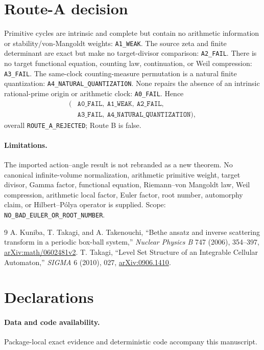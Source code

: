 \documentclass[10pt]{article}
\newif\ifroundzero
\newif\ifroundone
\begin{document}
\section{Route-A decision}
Primitive cycles are intrinsic and complete but contain no arithmetic
information or stability/von-Mangoldt weights: \texttt{A1\_WEAK}.  The
source zeta and finite determinant are exact but make no target-divisor
comparison: \texttt{A2\_FAIL}.  There is no target functional equation,
counting law, continuation, or Weil compression: \texttt{A3\_FAIL}.  The
same-clock counting-measure permutation is a natural finite quantization:
\texttt{A4\_NATURAL\_QUANTIZATION}.  None repairs the absence of an intrinsic
rational-prime origin or arithmetic clock: \texttt{A0\_FAIL}.  Hence
\[
\begin{aligned}
(&\texttt{A0\_FAIL},\ \texttt{A1\_WEAK},\ \texttt{A2\_FAIL},\\
 &\texttt{A3\_FAIL},\ \texttt{A4\_NATURAL\_QUANTIZATION}),
\end{aligned}
\]
overall \texttt{ROUTE\_A\_REJECTED}; Route B is false.

\paragraph{Limitations.}
The imported action--angle result is not rebranded as a new theorem.  No
canonical infinite-volume normalization, arithmetic primitive weight, target
divisor, Gamma factor, functional equation, Riemann--von Mangoldt law, Weil
compression, arithmetic local factor, Euler factor, root number, automorphy
claim, or Hilbert--P\'olya operator is supplied.  Scope:
\texttt{NO\_BAD\_EULER\_OR\_ROOT\_NUMBER}.
\fi
\fi

\begin{thebibliography}{9}
A. Kuniba, T. Takagi, and A. Takenouchi,
``Bethe ansatz and inverse scattering transform in a periodic box-ball
system,'' \emph{Nuclear Physics B} 747 (2006), 354--397,
\href{https://arxiv.org/abs/math/0602481}{arXiv:math/0602481v2}.
T. Takagi, ``Level Set Structure of an Integrable Cellular Automaton,''
\emph{SIGMA} 6 (2010), 027,
\href{https://sigma-journal.com/2010/027/}{arXiv:0906.1410}.
\end{thebibliography}

\ifroundzero\else\ifroundone\else
\section*{Declarations}
\paragraph{Data and code availability.} Package-local exact evidence and
deterministic code accompany this manuscript.
\end{document}
